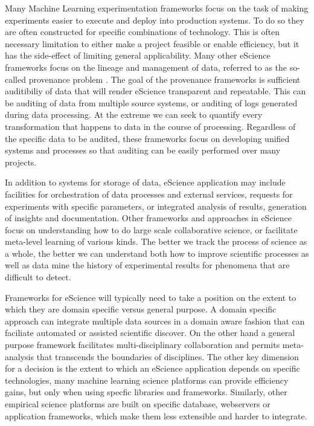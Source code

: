 \documentclass[sigconf]{acmart}
\begin{document}
Many Machine Learning experimentation frameworks focus on the task of making experiments
easier to execute and deploy into production systems\cite{Alberti:2018,MolnerDomenech:2020}. 
To do so they are often constructed for specific combinations of technology. 
This is often necessary limitation to either make a project feasible or enable efficiency, 
but it has the side-effect of limiting general applicability.
Many other eScience frameworks focus on the lineage and management of data, referred to as 
the so-called provenance problem \cite{Sahoo:2008,Conquest:2021}.
The goal of the provenance frameworks is sufficient auditibiliy of data that will 
render eScience transparent and repeatable. This can be auditing of data from multiple 
source systems, or auditing of logs generated during data processing\cite{Ferdous2020}. 
At the extreme we can seek to quantify every transformation that happens to data in 
the course of processing\cite{Sahoo2009}. Regardless of the
specific data to be audited, these frameworks focus on developing unified systems and 
processes so that auditing can be easily performed over many projects.

In addition to systems for storage of data, eScience application may include facilities
for orchestration of data processes and external services\cite{Subramanian2013}, 
requests for experiments with specific parameters\cite{Hunter:2005}, 
or integrated analysis of results, generation of insights and documentation. 
Other frameworks and approaches in eScience focus on understanding how to do large 
scale collaborative science, or facilitate meta-level learning of various 
kinds\cite{Hunter:2005,Liu:2023}. The better we track the
process of science as a whole, the better we can understand both how to improve 
scientific processes as well as data mine the history of experimental results for 
phenomena that are difficult to detect.

Frameworks for eScience will typically need to take a position on the extent to which 
they are domain specific versus general purpose. A domain specific approach can 
integrate multiple data sources in a domain aware fashion that can faciliate 
automated or assisted scientific discover\cite{Howe2008}. On the
other hand a general purpose framework facilitates multi-disciplinary collaboration 
and permits meta-analysis that transcends the boundaries of disciplines. 
The other key dimension for a decision is the extent to which an eScience 
application depends on specific technologies, many machine learning science platforms
can provide efficiency gains, but only when using specfic libraries and 
frameworks\cite{Alberti:2018,MolnerDomenech:2020}. Similarly, other empirical 
science platforms are built on specific database, webservers or application
frameworks, which make them less extensible and harder to integrate.
\end{document}
